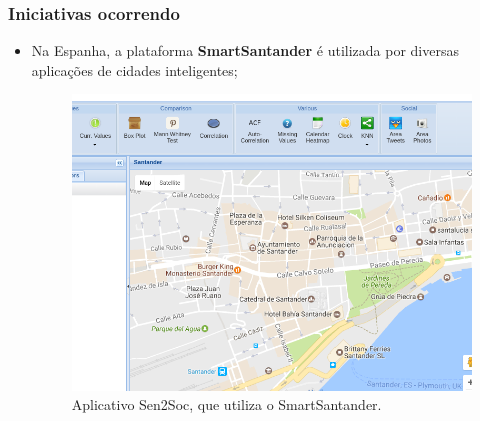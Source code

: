 \begin{frame}
    \frametitle{Iniciativas ocorrendo}
    \begin{itemize}
        \item Na Espanha, a plataforma \textbf{SmartSantander} é utilizada
            por diversas aplicações de cidades inteligentes;

        \begin{figure}
            \includegraphics[scale=0.2]{figures/sen2soc.png}
            \caption{Aplicativo Sen2Soc, que utiliza o SmartSantander.}
        \end{figure}
    \end{itemize}
\end{frame}

